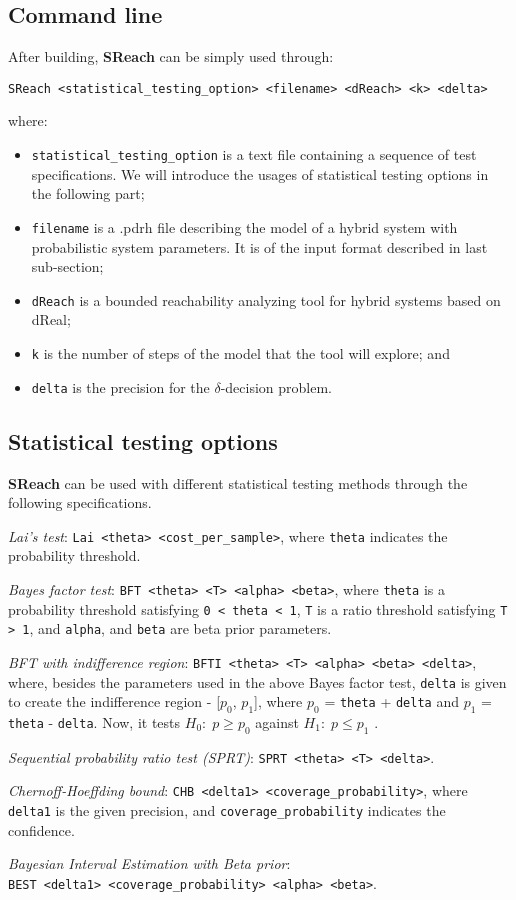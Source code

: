 \subsection{Command line}
After building, {\bf SReach} can be simply used through:
\begin{verbatim} 
SReach <statistical_testing_option> <filename> <dReach> <k> <delta>
\end{verbatim} 
where:
\begin{itemize}
\item \verb+statistical_testing_option+ is a text file containing a sequence of test specifications. We will introduce the usages of statistical testing options in the following part;
\item \verb+filename+ is a .pdrh file describing the model of a hybrid system with probabilistic system parameters. It is of the input format described in last sub-section;
\item \verb+dReach+ is a bounded reachability analyzing tool for hybrid systems based on dReal;
\item \verb+k+ is the number of steps of the model that the tool will explore; and
\item \verb+delta+ is the precision for the $\delta$-decision problem.
\end{itemize}

\subsection{Statistical testing options}

{\bf SReach} can be used with different statistical testing methods through the following specifications.

\textit {Lai's test}: \verb+Lai <theta> <cost_per_sample>+, where \verb+theta+ indicates the probability threshold.
 
\textit {Bayes factor test}: \verb+BFT <theta> <T> <alpha> <beta>+,
where \verb+theta+ is a probability threshold satisfying \verb+0 < theta < 1+, \verb+T+ is a ratio threshold satisfying \verb+T > 1+, and \verb+alpha+, and \verb+beta+ are beta prior parameters.

\textit {BFT with indifference region}: \verb+BFTI <theta> <T> <alpha> <beta> <delta>+,
where, besides the parameters used in the above Bayes factor test, \verb+delta+ is given to create the indifference region - [$p_0$, $p_1$], where $p_0$ = \verb+theta+ + \verb+delta+ and $p_1$ = \verb+theta+  - \verb+delta+.  Now, it tests $H_0 :\; p \ge p_0$ against $H_1:\; p \le p_1$ .

\textit {Sequential probability ratio test (SPRT)}: \verb+SPRT <theta> <T> <delta>+.

\textit {Chernoff-Hoeffding bound}: \verb+CHB <delta1> <coverage_probability>+,
where \verb+delta1+ is the given precision, and \verb+coverage_probability+ indicates the confidence.

\textit {Bayesian Interval Estimation with Beta prior}: \\ \verb+BEST <delta1> <coverage_probability> <alpha> <beta>+.


